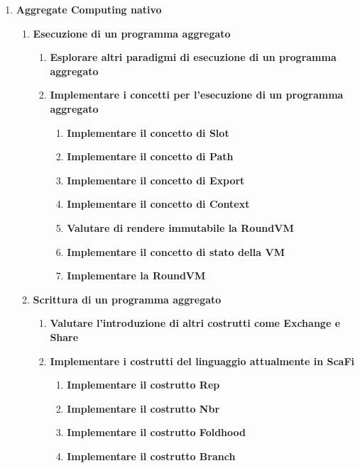 \documentclass[12pt, a4paper]{article}
\begin{document}
\begin{enumerate}
    \color{teal}
    \item \textbf{Aggregate Computing nativo}
          \begin{enumerate}
              \item \textbf{Esecuzione di un programma aggregato}
                    \begin{enumerate}
                        \item \textbf{Esplorare altri paradigmi di esecuzione di un programma aggregato}
                        \item \textbf{Implementare i concetti per l'esecuzione di un programma aggregato}
                              \begin{enumerate}
                                  \item \textbf{Implementare il concetto di Slot}
                                  \item \textbf{Implementare il concetto di Path}
                                  \item \textbf{Implementare il concetto di Export}
                                  \item \textbf{Implementare il concetto di Context}
                                  \item \textbf{Valutare di rendere immutabile la RoundVM}
                                  \item \textbf{Implementare il concetto di stato della VM}
                                  \item \textbf{Implementare la RoundVM}
                              \end{enumerate}
                    \end{enumerate}

              \item \textbf{Scrittura di un programma aggregato}
                    \begin{enumerate}
                        \item \textbf{Valutare l'introduzione di altri costrutti come Exchange e Share}
                        \item \textbf{Implementare i costrutti del linguaggio attualmente in ScaFi}
                              \begin{enumerate}
                                  \item \textbf{Implementare il costrutto Rep}
                                  \item \textbf{Implementare il costrutto Nbr}
                                  \item \textbf{Implementare il costrutto Foldhood}
                                  \item \textbf{Implementare il costrutto Branch}
                              \end{enumerate}
                    \end{enumerate}



\end{enumerate}
\end{enumerate}
\end{document}
